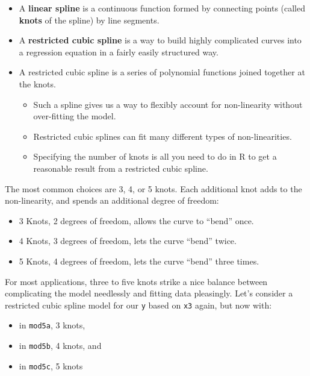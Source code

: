 \documentclass[]{book}
\providecommand{\tightlist}{%
  \setlength{\itemsep}{0pt}\setlength{\parskip}{0pt}}
\theoremstyle{definition}
\theoremstyle{definition}
\theoremstyle{definition}
\theoremstyle{remark}
\begin{document}
\begin{itemize}
\tightlist
\item
  A \textbf{linear spline} is a continuous function formed by connecting
  points (called \textbf{knots} of the spline) by line segments.
\item
  A \textbf{restricted cubic spline} is a way to build highly
  complicated curves into a regression equation in a fairly easily
  structured way.
\item
  A restricted cubic spline is a series of polynomial functions joined
  together at the knots.

  \begin{itemize}
  \tightlist
  \item
    Such a spline gives us a way to flexibly account for non-linearity
    without over-fitting the model.
  \item
    Restricted cubic splines can fit many different types of
    non-linearities.
  \item
    Specifying the number of knots is all you need to do in R to get a
    reasonable result from a restricted cubic spline.
  \end{itemize}
\end{itemize}

The most common choices are 3, 4, or 5 knots. Each additional knot adds
to the non-linearity, and spends an additional degree of freedom:

\begin{itemize}
\tightlist
\item
  3 Knots, 2 degrees of freedom, allows the curve to ``bend'' once.
\item
  4 Knots, 3 degrees of freedom, lets the curve ``bend'' twice.
\item
  5 Knots, 4 degrees of freedom, lets the curve ``bend'' three times.
\end{itemize}

For most applications, three to five knots strike a nice balance between
complicating the model needlessly and fitting data pleasingly. Let's
consider a restricted cubic spline model for our \texttt{y} based on
\texttt{x3} again, but now with:

\begin{itemize}
\tightlist
\item
  in \texttt{mod5a}, 3 knots,
\item
  in \texttt{mod5b}, 4 knots, and
\item
  in \texttt{mod5c}, 5 knots
\end{itemize}
\end{document}
